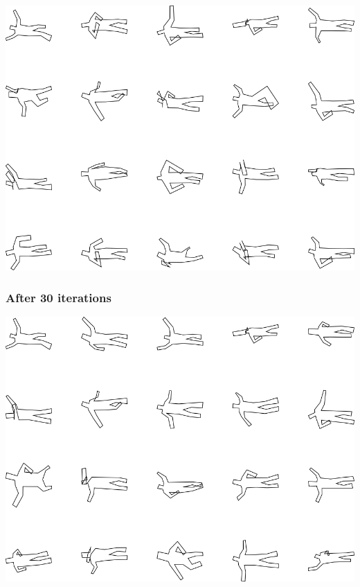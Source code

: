 \includegraphics[width=6in]{output/3.learning/correlated_tuning/correlated_tuning_iter20_.png}
\subsubsection{After 30 iterations}

\includegraphics[width=6in]{output/3.learning/correlated_tuning/correlated_tuning_iter30_.png}

